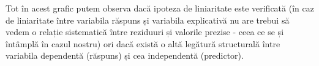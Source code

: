 \documentclass[]{article}
\begin{document}
Tot în acest grafic putem observa dacă ipoteza de liniaritate este
verificată (în caz de liniaritate între variabila răspuns și variabila
explicativă nu are trebui să vedem o relație sistematică între reziduuri
și valorile prezise - ceea ce se și întâmplă în cazul nostru) ori dacă
există o altă legătură structurală între variabila dependentă (răspuns)
și cea independentă (predictor).


\end{document}
